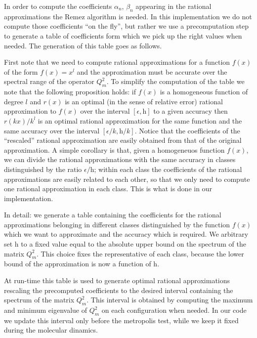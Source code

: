 \documentclass{article}[12pt]
\begin{document}
In order to compute the coefficients $\alpha_n$, $\beta_n$ appearing in the rational approximations 
the Remez algorithm is needed. In this implementation we do not compute those coefficients ``on the fly'', but rather
we use a precomputation step to generate a table of coefficients form which we pick up the right values when needed.
The generation of this table goes as follows.

First note that we need to compute rational approximations for a function $f(x)$ of the form $f(x)=x^l$ and the approximation
must be accurate over the spectral range of the operator $Q_m^2$.
To simplify the computation of the table we note that the following proposition holds:
if $f(x)$ is a homogeneous function of degree $l$ and $r(x)$ is an optimal (in the sense of relative error) 
rational approximation to $f(x)$ over the interval $[\epsilon,\mathrm{h}]$ to a given accuracy 
then $r(kx)/k^l$ is an optimal rational approximation for the same function and the same accuracy 
over the interval $[\epsilon/k,\mathrm{h}/k]$. Notice that the coefficients of the ``rescaled'' rational
approximation are easily obtained from that of the original approximation.
A simple corollary is that, given a homogeneuos function $f(x)$, we can divide the rational approximations
with the same accuracy in classes distinguished by the ratio $\epsilon/\mathrm{h}$; within each class
the coefficients of the rational approximations are easily related to each other, so that we only need
to compute one rational approximation in each class. This is what is done in our implementation.

In detail: we generate a table containing the coefficients for the rational approximations
 belonging in different classes distinguished by the function $f(x)$ which we want to approximate and 
 the accuracy which is required. We arbitrary set $\mathrm{h}$ to a fixed value equal to the absolute
 upper bound on the spectrum of the matrix $Q_m^2$. This choice fixes the representative of each class, 
because the lower bound of the approximation is now a function of $\mathrm{h}$.

At run-time this table is used to generate optimal rational approximations rescaling the 
precomputed coefficients to the desired interval containing the spectrum of the matrix $Q_m^2$.
This interval is obtained by computing the maximum and minimum eigenvalue of $Q_m^2$ on 
each configuration when needed. In our code we update this interval only before the 
metropolis test, while we keep it fixed during the molecular dinamics.
\end{document}
